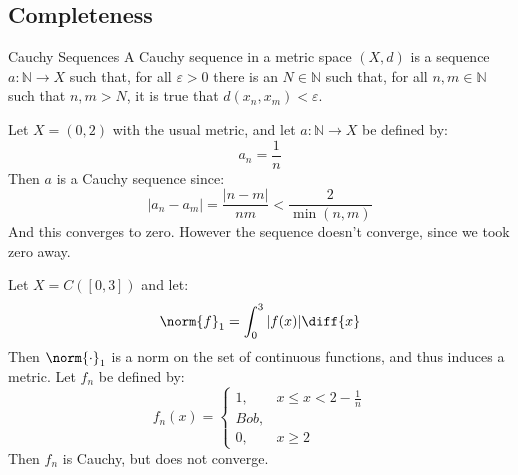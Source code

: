 \documentclass[crop=false,class=book,oneside]{standalone}
\begin{document}
        \subsection{Completeness}
            \begin{ldefinition}{Cauchy Sequences}
                A Cauchy sequence in a metric space $(X,d)$ is a
                sequence $a:\mathbb{N}\rightarrow{X}$ such that,
                for all $\varepsilon>0$ there is an
                $N\in\mathbb{N}$ such that, for all
                $n,m\in\mathbb{N}$ such that $n,m>N$,
                it is true that $d(x_{n},x_{m})<\varepsilon$.
            \end{ldefinition}
            \begin{lexample}
                Let $X=(0,2)$ with the usual metric, and let
                $a:\mathbb{N}\rightarrow{X}$ be defined by:
                \begin{equation}
                    a_{n}=\frac{1}{n}
                \end{equation}
                Then $a$ is a Cauchy sequence since:
                \begin{equation}
                    |a_{n}-a_{m}|=\frac{|n-m|}{nm}
                    <\frac{2}{\min(n,m)}
                \end{equation}
                And this converges to zero. However the sequence
                doesn't converge, since we took zero away.
            \end{lexample}
            \begin{lexample}
                Let $X=C([0,3])$ and let:
                \begin{equation}
                    \norm{f}_{1}=\int_{0}^{3}|f(x)|\diff{x}
                \end{equation}
                Then $\norm{\cdot}_{1}$ is a norm on the set of
                continuous functions, and thus induces a metric.
                Let $f_{n}$ be defined by:
                \begin{equation}
                    f_{n}(x)=
                    \begin{cases}
                        1,&x\leq{x}<2-\frac{1}{n}\\
                        Bob,\\
                        0,&x\geq{2}
                    \end{cases}
                \end{equation}
                Then $f_{n}$ is Cauchy, but does not converge.
            \end{lexample}
\end{document}
